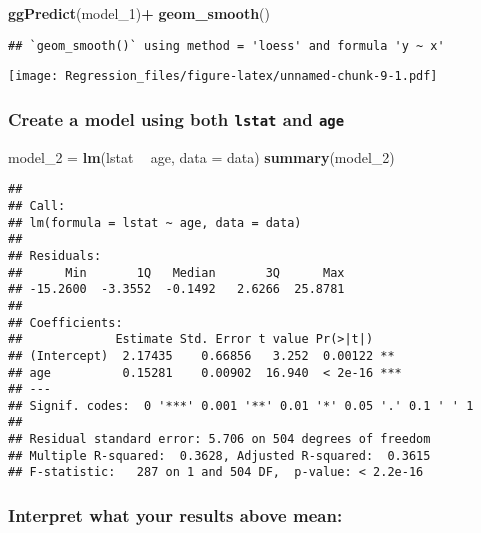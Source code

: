 \documentclass[]{article}
\newenvironment{Shaded}{\begin{snugshade}}{\end{snugshade}}
\newcommand{\DataTypeTok}[1]{\textcolor[rgb]{0.13,0.29,0.53}{#1}}
\newcommand{\DecValTok}[1]{\textcolor[rgb]{0.00,0.00,0.81}{#1}}
\newcommand{\KeywordTok}[1]{\textcolor[rgb]{0.13,0.29,0.53}{\textbf{#1}}}
\newcommand{\NormalTok}[1]{#1}
\newcommand{\OperatorTok}[1]{\textcolor[rgb]{0.81,0.36,0.00}{\textbf{#1}}}
\newcommand{\StringTok}[1]{\textcolor[rgb]{0.31,0.60,0.02}{#1}}
\begin{document}
\begin{Shaded}
\begin{Highlighting}[]
\KeywordTok{ggPredict}\NormalTok{(model_}\DecValTok{1}\NormalTok{)}\OperatorTok{+}
\StringTok{  }\KeywordTok{geom_smooth}\NormalTok{()}
\end{Highlighting}
\end{Shaded}

\begin{verbatim}
## `geom_smooth()` using method = 'loess' and formula 'y ~ x'
\end{verbatim}

\texttt{[image: Regression\_files/figure-latex/unnamed-chunk-9-1.pdf]}

\hypertarget{create-a-model-using-both-lstat-and-age}{%
\subsubsection{\texorpdfstring{Create a model using both \texttt{lstat}
and
\texttt{age}}{Create a model using both lstat and age}}\label{create-a-model-using-both-lstat-and-age}}

\begin{Shaded}
\begin{Highlighting}[]
\NormalTok{model_}\DecValTok{2}\NormalTok{ =}\StringTok{ }\KeywordTok{lm}\NormalTok{(lstat }\OperatorTok{~}\StringTok{ }\NormalTok{age, }\DataTypeTok{data =}\NormalTok{ data)}
\KeywordTok{summary}\NormalTok{(model_}\DecValTok{2}\NormalTok{)}
\end{Highlighting}
\end{Shaded}

\begin{verbatim}
## 
## Call:
## lm(formula = lstat ~ age, data = data)
## 
## Residuals:
##      Min       1Q   Median       3Q      Max 
## -15.2600  -3.3552  -0.1492   2.6266  25.8781 
## 
## Coefficients:
##             Estimate Std. Error t value Pr(>|t|)    
## (Intercept)  2.17435    0.66856   3.252  0.00122 ** 
## age          0.15281    0.00902  16.940  < 2e-16 ***
## ---
## Signif. codes:  0 '***' 0.001 '**' 0.01 '*' 0.05 '.' 0.1 ' ' 1
## 
## Residual standard error: 5.706 on 504 degrees of freedom
## Multiple R-squared:  0.3628, Adjusted R-squared:  0.3615 
## F-statistic:   287 on 1 and 504 DF,  p-value: < 2.2e-16
\end{verbatim}

\hypertarget{interpret-what-your-results-above-mean-2}{%
\subsubsection{Interpret what your results above
mean:}\label{interpret-what-your-results-above-mean-2}}
\end{document}
